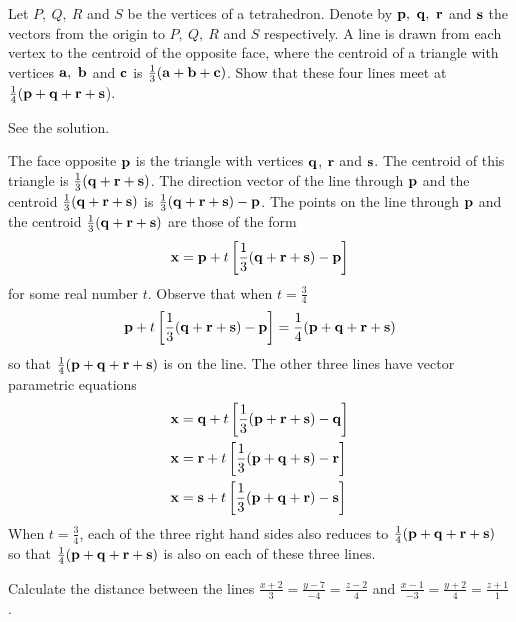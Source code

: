 \begin{question}
Let $P,\ Q,\ R$ and $S$ be the vertices of a tetrahedron.
Denote by $\mathbf{p},\ \mathbf{q},\ \mathbf{r}$ and $\mathbf{s}$ the vectors from the origin
to $P,\ Q,\ R$ and $S$ respectively. A line is drawn from each vertex to
the centroid of the opposite face, where the centroid of a triangle with 
vertices $\mathbf{a},\ \mathbf{b}$ and $\mathbf{c}$ is $\frac{1}{3}(\mathbf{a}+\mathbf{b}+\mathbf{c})$. 
Show that these four lines meet at $\frac{1}{4}(\mathbf{p}+\mathbf{q}+\mathbf{r}+\mathbf{s}$).
\end{question}

%

\begin{answer}
See the solution.
\end{answer}

\begin{solution}
The face opposite $\mathbf{p}$ is the triangle with vertices $\mathbf{q}$, $\mathbf{r}$ and $\mathbf{s}$. 
The centroid of this triangle is $\frac{1}{3}(\mathbf{q}+\mathbf{r}+\mathbf{s})$. 
The direction vector of the line through $\mathbf{p}$ and the 
centroid $\frac{1}{3}(\mathbf{q}+\mathbf{r}+\mathbf{s})$ is 
$\frac{1}{3}(\mathbf{q}+\mathbf{r}+\mathbf{s})-\mathbf{p}$. The points on the line through
$\mathbf{p}$ and the centroid $\frac{1}{3}(\mathbf{q}+\mathbf{r}+\mathbf{s})$ are those
of the form
\begin{equation*}
\mathbf{x}=\mathbf{p}+ t\left[\frac{1}{3}(\mathbf{q}+\mathbf{r}+\mathbf{s})-\mathbf{p}\right]
\end{equation*}
for some real number $t$. Observe that when $t=\frac{3}{4}$
$$
\mathbf{p}+ t\left[\frac{1}{3}(\mathbf{q}+\mathbf{r}+\mathbf{s})-\mathbf{p}\right]
=\frac{1}{4}(\mathbf{p}+\mathbf{q}+\mathbf{r}+\mathbf{s})
$$
so that $\frac{1}{4}(\mathbf{p}+\mathbf{q}+\mathbf{r}+\mathbf{s})$ is on the line.
The other three lines have vector parametric equations
\begin{align*}
\mathbf{x}&=\mathbf{q}+ t\left[\frac{1}{3}(\mathbf{p}+\mathbf{r}+\mathbf{s})-\mathbf{q}\right] \\
\mathbf{x}&=\mathbf{r}+ t\left[\frac{1}{3}(\mathbf{p}+\mathbf{q}+\mathbf{s})-\mathbf{r}\right] \\
\mathbf{x}&=\mathbf{s}+ t\left[\frac{1}{3}(\mathbf{p}+\mathbf{q}+\mathbf{r})-\mathbf{s}\right]
\end{align*}
When $t=\frac{3}{4}$, each of the three right hand sides also reduces
to $\frac{1}{4}(\mathbf{p}+\mathbf{q}+\mathbf{r}+\mathbf{s})$ so that
$\frac{1}{4}(\mathbf{p}+\mathbf{q}+\mathbf{r}+\mathbf{s})$ is also on each of these
three lines.
\end{solution}


\begin{question}
Calculate the distance between the lines 
$\frac{x+2}{3}=\frac{y-7}{-4}=\frac{z-2}{4}$ and $\frac{x-1}{-3}=\frac{y+2}{4}=\frac{z+1}{1}$.
\end{question}

